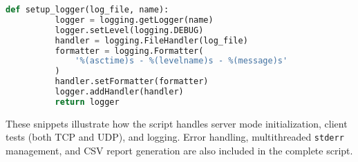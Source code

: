         \begin{lstlisting}[language=Python, caption={Excerpt for logging setup.}]
      def setup_logger(log_file, name):
          logger = logging.getLogger(name)
          logger.setLevel(logging.DEBUG)
          handler = logging.FileHandler(log_file)
          formatter = logging.Formatter(
              '%(asctime)s - %(levelname)s - %(message)s'
          )
          handler.setFormatter(formatter)
          logger.addHandler(handler)
          return logger
        \end{lstlisting}

    \noindent These snippets illustrate how the script handles server mode initialization, client tests (both TCP and UDP), and logging. 
    Error handling, multithreaded \texttt{stderr} management, and CSV report generation are also included in the complete script.